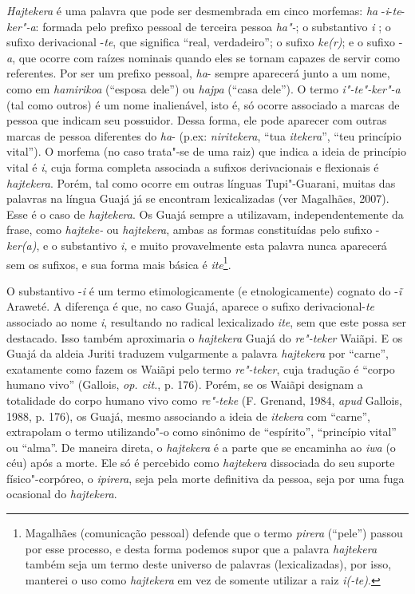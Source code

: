 \emph{Hajtekera} é uma palavra que pode ser desmembrada em cinco
morfemas: \emph{ha} -\emph{i}-\emph{te}-\emph{ker"-a}: formada pelo
prefixo pessoal de terceira pessoa \emph{ha"-}; o substantivo \emph{i} ;
o sufixo derivacional -\emph{te}, que significa ``real, verdadeiro''; o
sufixo \emph{ke(r)}; e o sufixo -\emph{a}, que ocorre com raízes
nominais quando eles se tornam capazes de servir como referentes. Por
ser um prefixo pessoal, \emph{ha}- sempre aparecerá junto a um nome,
como em \emph{hamirikoa} (``esposa dele'') ou \emph{hajpa} (``casa dele'').
O termo \emph{i"-te"-ker"-a} (tal como outros) é um nome inalienável, isto
é, só ocorre associado a marcas de pessoa que indicam seu possuidor.
Dessa forma, ele pode aparecer com outras marcas de pessoa diferentes do
\emph{ha}- (p.ex: \emph{niritekera}, ``tua \emph{itekera}'', ``teu
princípio vital''). O morfema (no caso trata"-se de uma raiz) que indica a
ideia de princípio vital é \emph{i}, cuja forma completa associada a
sufixos derivacionais e flexionais é \emph{hajtekera}. Porém, tal como
ocorre em outras línguas Tupi"-Guarani, muitas das palavras na língua
Guajá já se encontram lexicalizadas (ver Magalhães, 2007). Esse é o caso
de \emph{hajtekera}. Os Guajá sempre a utilizavam, independentemente da
frase, como \emph{hajteke-} ou \emph{hajtekera}, ambas as formas
constituídas pelo sufixo -\emph{ker(a)}, e o substantivo \emph{i,} e
muito provavelmente esta palavra nunca aparecerá sem os sufixos, e sua
forma mais básica é \emph{ite}\footnote{Magalhães (comunicação pessoal)
  defende que o termo \emph{pirera} (``pele'') passou por esse processo, e
  desta forma podemos supor que a palavra \emph{hajtekera} também seja
  um termo deste universo de palavras (lexicalizadas), por isso,
  manterei o uso como \emph{hajtekera} em vez de somente utilizar a raiz
  \emph{i(-te)}.}.

O substantivo -\emph{i} é um termo etimologicamente (e etnologicamente)
cognato do -\emph{ĩ} Araweté. A diferença é que, no caso Guajá, aparece
o sufixo derivacional-\emph{te} associado ao nome \emph{i}, resultando
no radical lexicalizado \emph{ite}, sem que este possa ser destacado.
Isso também aproximaria o \emph{hajtekera} Guajá do \emph{re"-teker}
Waiãpi. E os Guajá da aldeia Juriti traduzem vulgarmente a palavra
\emph{hajtekera} por ``carne'', exatamente como fazem os Waiãpi pelo termo
\emph{re"-teker}, cuja tradução é ``corpo humano vivo'' (Gallois, \emph{op. cit.},
p. 176). Porém, se os Waiãpi designam a totalidade do corpo humano vivo
como \emph{re"-teke} (F. Grenand, 1984, \emph{apud} Gallois, 1988, p. 176), os
Guajá, mesmo associando a ideia de \emph{itekera} com ``carne'',
extrapolam o termo utilizando"-o como sinônimo de ``espírito'', ``princípio
vital'' ou ``alma''. De maneira direta, o \emph{hajtekera} é a parte que se
encaminha ao \emph{iwa} (o céu) após a morte. Ele só é percebido como
\emph{hajtekera} dissociada do seu suporte físico"-corpóreo, o
\emph{ipirera}, seja pela morte definitiva da pessoa, seja por uma fuga
ocasional do \emph{hajtekera}.

